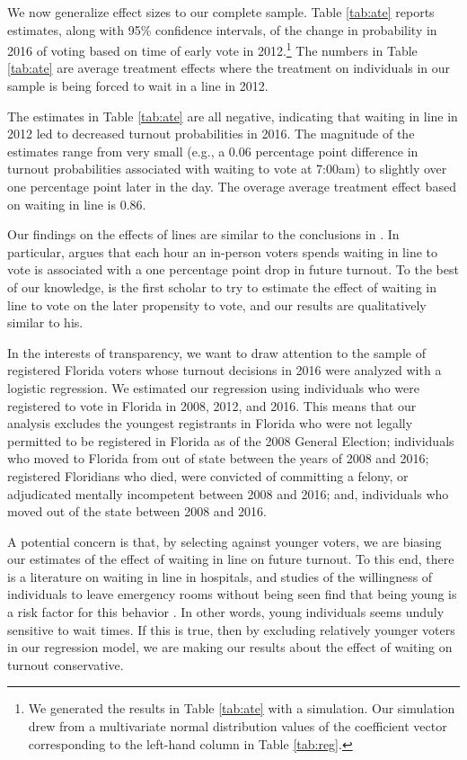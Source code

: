 \documentclass[12pt,titlepage]{article}
\begin{document}
We now generalize effect sizes to our complete sample.  Table
\ref{tab:ate} reports estimates, along with 95\% confidence intervals,
of the change in probability in 2016 of voting based on time of early
vote in 2012.\footnote{We generated the results in Table \ref{tab:ate}
  with a simulation.  Our simulation drew from a multivariate normal
  distribution values of the coefficient vector corresponding to the
  left-hand column in Table \ref{tab:reg}.}  The numbers in Table
\ref{tab:ate} are average treatment effects where the treatment on
individuals in our sample is being forced to wait in a line in 2012.



The estimates in Table \ref{tab:ate} are all negative, indicating that
waiting in line in 2012  led to decreased turnout probabilities in
2016.  The magnitude of the estimates range from very small (e.g.,
a 0.06 percentage point difference in turnout probabilities associated
with waiting to vote at 7:00am) to slightly over one percentage point
later in the day.  The overage average treatment effect based on
waiting in line is 0.86.

Our findings on the effects of lines are similar to the conclusions in
\citet{pettigrew:longlinesminorityprecincts}.  In particular,
\citeauthor{pettigrew:longlinesminorityprecincts} argues that each
hour an in-person voters spends waiting in line to vote is associated
with a one percentage point drop in future turnout.  To the best of
our knowledge, \citeauthor{pettigrew:longlinesminorityprecincts} is
the first scholar to try to estimate the effect of waiting in line to
vote on the later propensity to vote, and our results are
qualitatively similar to his.

In the interests of transparency, we want to draw attention to the
sample of registered Florida voters whose turnout decisions in 2016
were analyzed with a logistic regression.  We estimated our regression
using individuals who were registered to vote in Florida in 2008,
2012, and 2016.  This means that our analysis excludes the youngest
registrants in Florida who were not legally permitted to be registered
in Florida as of the 2008 General Election; individuals who moved to
Florida from out of state between the years of 2008 and 2016;
registered Floridians who died, were convicted of committing a felony,
or adjudicated mentally incompetent between 2008 and 2016; and,
individuals who moved out of the state between 2008 and 2016.

A potential concern is that, by selecting against younger voters, we
are biasing our estimates of the effect of waiting in line on future
turnout. To this end, there is a literature on waiting in line in
hospitals, and studies of the willingness of individuals to leave
emergency rooms without being seen find that being young is a risk
factor for this behavior
\citep{sunetal:lwbs,clareycooke:emergencyroomleave,shaikh:howlongwaiter}.
In other words, young individuals seems unduly sensitive to wait
times. If this is true, then by excluding relatively younger voters in
our regression model, we are making our results about the effect of
waiting on turnout conservative.
\end{document}
